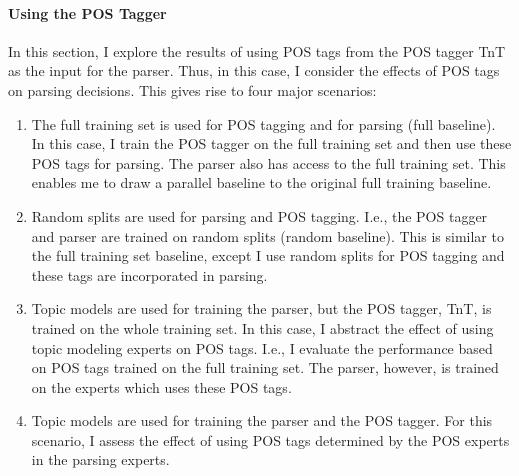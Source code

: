 
\paragraph*{Using the POS Tagger}\label{TnTPOSinParsing}

In this section, I explore the results of using POS tags from the POS tagger TnT as the input for the parser. Thus, in this case, I consider the effects of POS tags on parsing decisions. This gives rise to four major scenarios:

\begin{enumerate}
	\item The full training set is used for POS tagging and for parsing (full baseline). In this case, I train the POS tagger on the full training set and then use these POS tags for parsing. The parser also has access to the full training set. This enables me to draw a parallel baseline to the original full training baseline.
	\item Random splits are used for parsing and POS tagging. I.e., the POS tagger and parser are trained on random splits (random baseline). This is similar to the full training set baseline, except I use random splits for POS tagging and these tags are incorporated in parsing. 
	\item Topic models are used for training the parser, but the POS tagger, TnT, is trained on the whole training set. In this case, I abstract the effect of using topic modeling experts on POS tags. I.e., I evaluate the performance based on POS tags trained on the full training set. The parser, however, is trained on the experts which uses these POS tags.
	\label{S2}
	\item Topic models are used for training the parser and the POS tagger. For this scenario, I assess the effect of using POS tags determined by the POS experts in the parsing experts. \label{S1}
\end{enumerate}

